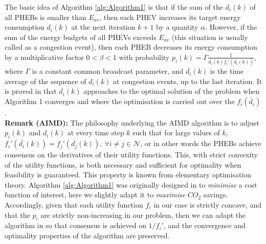 \documentclass[journal]{IEEEtran}
\begin{document}
The basic idea of Algorithm \ref{alg:Algorithm1} is that if the sum of the $d_i(k)$ of all PHEBs is smaller than $E_{av}$, then each PHEV increases its target energy consumption $d_i(k)$ at the next iteration $k + 1$ by a quantity $\alpha$. However, if the sum of the energy budgets of all PHEVs exceeds $E_{av}$ (this situation is usually called as a congestion event), then each PHEB decreases its energy consumption by a multiplicative factor $0 < \beta < 1$ with probability $p_i(k) = \Gamma \frac{1}{\overline{d_i}(k) f_i'(\overline{d_i}(k))}$, where $\Gamma$ is a constant common broadcast parameter, and $\overline{d_i}(k)$ is the time average of the sequence of $d_i(k)$ at congestion events, up to the last iteration. It is proved in \cite{wirth2014nonhomogeneous} that $\overline{d_i}(k)$ approaches to the optimal solution of the problem when Algorithm 1 converges and where the optimisation is carried out over the $f_i(\bar{d}_i)$. \\

\noindent \textbf{Remark (AIMD):} The philosophy underlying the AIMD algorithm is to adjust $p_i(k)$ and $d_i(k)$ at every time step $k$ such that for large values of $k$, $f_i'(\overline{d_i}(k)) = f_j'(\overline{d_j}(k)), ~\forall i \neq j \in \mathcal{N}$, or in other words the PHEBs achieve consensus on the derivatives of their utility functions. This, with strict convexity of the utility functions, is both necessary and sufficient for optimality when feasibility is guaranteed. This property is known from elementary optimisation theory. Algorithm \ref{alg:Algorithm1} was originally designed in \cite{wirth2014nonhomogeneous} to \textit{minimise} a cost function of interest, here we slightly adapt it to \textit{maximise} $CO_2$ savings. Accordingly, given that each utility function $f_i$ in our case is strictly concave, and that the $p_i$ are strictly non-increasing in our problem, then we can adapt the algorithm in \cite{wirth2014nonhomogeneous} so that consensus is achieved on $1/f_i'$, and the convergence and optimality properties of the algorithm are preserved.\newline
\end{document}
